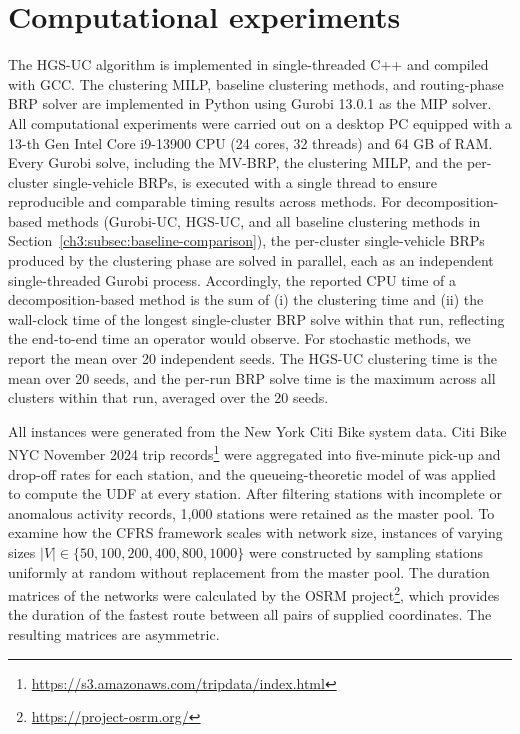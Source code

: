 \section{Computational experiments}\label{ch3:sec:computational-experiments}

The HGS-UC algorithm is implemented in single-threaded C++ and compiled with GCC. The clustering MILP, baseline clustering methods, and routing-phase BRP solver are implemented in Python using Gurobi 13.0.1 as the MIP solver. All computational experiments were carried out on a desktop PC equipped with a 13-th Gen Intel Core i9-13900 CPU (24 cores, 32 threads) and 64 GB of RAM. Every Gurobi solve, including the MV-BRP, the clustering MILP, and the per-cluster single-vehicle BRPs, is executed with a single thread to ensure reproducible and comparable timing results across methods. For decomposition-based methods (Gurobi-UC, HGS-UC, and all baseline clustering methods in Section~\ref{ch3:subsec:baseline-comparison}), the per-cluster single-vehicle BRPs produced by the clustering phase are solved in parallel, each as an independent single-threaded Gurobi process. Accordingly, the reported CPU time of a decomposition-based method is the sum of (i) the clustering time and (ii) the wall-clock time of the longest single-cluster BRP solve within that run, reflecting the end-to-end time an operator would observe. For stochastic methods, we report the mean over 20 independent seeds. The HGS-UC clustering time is the mean over 20 seeds, and the per-run BRP solve time is the maximum across all clusters within that run, averaged over the 20 seeds.

All instances were generated from the New York Citi Bike system data. Citi Bike NYC November 2024 trip records\footnote{\url{https://s3.amazonaws.com/tripdata/index.html}} were aggregated into five-minute pick-up and drop-off rates for each station, and the queueing-theoretic model of \citet{ravivOptimalInventoryManagement2013} was applied to compute the UDF at every station. After filtering stations with incomplete or anomalous activity records, 1,000 stations were retained as the master pool. To examine how the CFRS framework scales with network size, instances of varying sizes $|V|\in \{50,100,200,400,800,1000\}$ were constructed by sampling stations uniformly at random without replacement from the master pool. The duration matrices of the networks were calculated by the OSRM project\footnote{\url{https://project-osrm.org/}}, which provides the duration of the fastest route between all pairs of supplied coordinates. The resulting matrices are asymmetric.

